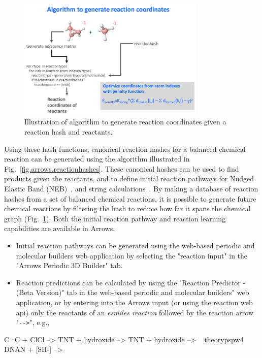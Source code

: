 \documentclass[runningheads,a4paper]{llncs}
\begin{document}
\begin{figure}[!H]
\includegraphics[angle=90,width=0.8\textwidth]{images/gencoords.png}
\caption{Illustration of algorithm to generate reaction coordinates given a reaction hash and reactants.}
\label{fig.arrows.reactionhashes2}
\end{figure}
Using these hash functions, canonical reaction hashes for a balanced chemical reaction can be generated using the algorithm illustrated in Fig.~\ref{fig.arrows.reactionhashes}.  These canonical hashes can be used to find products given the reactants, and to define initial reaction pathways for Nudged Elastic Band (NEB)~\cite{jonsson1998nudged,henkelman2000climbing}, and string calculations~\cite{weinan2002string}.  By making a database of reaction hashes from a set of balanced chemical reactions, it is possible to generate future chemical reactions by filtering the hash to reduce how far it spans the chemical graph (Fig.~\ref{fig.arrows.reactionhashes2}).  Both the initial reaction pathway and reaction learning capabilities are available in Arrows.
\begin{itemize}
\item Initial reaction pathways can be generated using the web-based periodic and molecular builders web application by selecting the "reaction input" in the "Arrows Periodic 3D Builder" tab.  
\item Reaction predictions can be calculated by using the "Reaction Predictor - (Beta Version)" tab in the web-based periodic and molecular builders" web application, or by 
entering into the Arrows input (or using the reaction web api) only the reactants of an \textit{esmiles reaction} followed by the reaction arrow "\verb|-->|", e.g.,
\end{itemize}
\begin{center}\begin{boxedverbatim}
C=C + ClCl -->  
TNT + hydroxide --> 
TNT + hydroxide --> ~ theory{pspw4}
DNAN + [SH-] -->  
\end{boxedverbatim}
\end{center}
\end{document}
